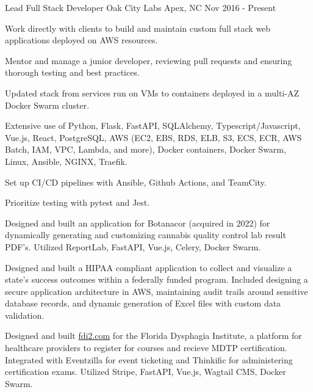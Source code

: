 

\begin{cventries}

  \cventry
    {Lead Full Stack Developer} %
    {Oak City Labs} %
    {Apex, NC} %
    {Nov 2016 - Present} %
    {
      \begin{cvitems} %
        \item {Work directly with clients to build and maintain custom full stack web applications deployed on AWS resources.}
        \item {Mentor and manage a junior developer, reviewing pull requests and ensuring thorough testing and best practices.}
        \item {Updated stack from services run on VMs to containers deployed in a multi-AZ Docker Swarm cluster.}
        \item {Extensive use of Python, Flask, FastAPI, SQLAlchemy, Typescript/Javascript, Vue.js, React, PostgreSQL, AWS (EC2, EBS, RDS, ELB, S3, ECS, ECR, AWS Batch, IAM, VPC, Lambda, and more), Docker containers, Docker Swarm, Linux, Ansible, NGINX, Traefik.}
        \item {Set up CI/CD pipelines with Ansible, Github Actions, and TeamCity.}
        \item {Prioritize testing with pytest and Jest.}
        \item {Designed and built an application for Botanacor (acquired in 2022) for dynamically generating and customizing cannabis quality control lab result PDF's. Utilized ReportLab, FastAPI, Vue.js, Celery, Docker Swarm.}
        \item {Designed and built a HIPAA compliant application to collect and visualize a state's success outcomes within a federally funded program. Included designing a secure application architecture in AWS, maintaining audit trails around sensitive database records, and dynamic generation of Excel files with custom data validation.}
        \item {Designed and built \href{https://fdi2.com}{fdi2.com} for the Florida Dysphagia Institute, a platform for healthcare providers to register for courses and recieve MDTP certification. Integrated with Eventzilla for event ticketing and Thinkific for administering certification exams. Utilized Stripe, FastAPI, Vue.js, Wagtail CMS, Docker Swarm.}

\end{cvitems}}
\end{cventries}
